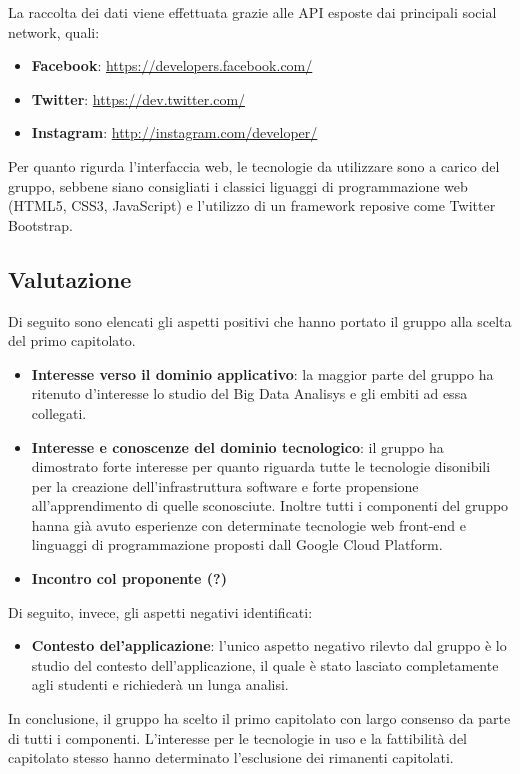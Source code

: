 La raccolta dei dati viene effettuata grazie alle API esposte dai principali social network, quali:
\begin{itemize}
\item \textbf{Facebook}: \url{https://developers.facebook.com/}
\item \textbf{Twitter}: \url{https://dev.twitter.com/}
\item \textbf{Instagram}: \url{http://instagram.com/developer/}
\end{itemize}
Per quanto rigurda l'interfaccia web, le tecnologie da utilizzare sono a carico del gruppo, sebbene siano consigliati i classici liguaggi di programmazione web (HTML5, CSS3, JavaScript) e l'utilizzo di un framework reposive come Twitter Bootstrap.
\subsection{Valutazione}
Di seguito sono elencati gli aspetti positivi che hanno portato il gruppo alla scelta del primo capitolato.
\begin{itemize}
\item \textbf{Interesse verso il dominio applicativo}: la maggior parte del gruppo ha ritenuto d'interesse lo studio del Big Data Analisys e gli embiti ad essa collegati.
\item \textbf{Interesse e conoscenze del dominio tecnologico}: il gruppo ha dimostrato forte interesse per quanto riguarda tutte le tecnologie disonibili per la creazione dell'infrastruttura software e forte propensione all'apprendimento di quelle sconosciute. Inoltre tutti i componenti del gruppo hanna già avuto esperienze con determinate tecnologie web front-end e linguaggi di programmazione proposti dall Google Cloud Platform.
\item \textbf{Incontro col proponente (?)}
\end{itemize}
Di seguito, invece, gli aspetti negativi identificati:
\begin{itemize}
\item \textbf{Contesto del'applicazione}: l'unico aspetto negativo rilevto dal gruppo è lo studio del contesto dell'applicazione, il quale è stato lasciato completamente agli studenti e richiederà un lunga analisi.
\end{itemize}
In conclusione, il gruppo ha scelto il primo capitolato con largo consenso da parte di tutti i componenti. L'interesse per le tecnologie in uso e la fattibilità del capitolato stesso hanno determinato l'esclusione dei rimanenti capitolati.





